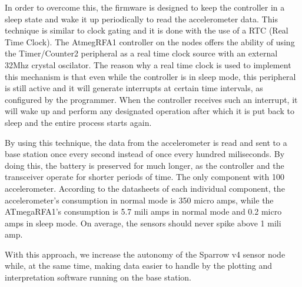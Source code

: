 In order to overcome this, the firmware is designed to keep the controller in a sleep state and wake it up periodically to read the accelerometer data. 
This technique is similar to clock gating and it is done with the use of a RTC (Real Time Clock). The AtmegRFA1 controller on the nodes offers the ability of using the Timer/Counter2 
peripheral as a real time clock source with an external 32Mhz crystal oscilator. The reason why a real time clock is used to implement this mechanism is that even while the controller 
is in sleep mode, this peripheral is still active and it will generate interrupts at certain time intervals, as configured by the programmer. When the controller receives such an 
interrupt, it will wake up and perform any designated operation after which it is put back to sleep and the entire process starts again.

By using this technique, the data from the accelerometer is read and sent to a base station once every second instead of once every hundred miliseconds. By doing this, 
the battery is preserved for much longer, as the controller and the transceiver operate for shorter periods of time. The only component with 100%
accelerometer. According to the datasheets of each individual component, the accelerometer's consumption in normal mode is 350 micro amps, while the ATmegaRFA1's consumption is
5.7 mili amps in normal mode and 0.2 micro amps in sleep mode. On average, the sensors should never spike above 1 mili amp. 

With this approach, we increase the autonomy of the Sparrow v4 sensor node while, at the same time, making data easier to handle by the plotting and interpretation software running 
on the base station.
